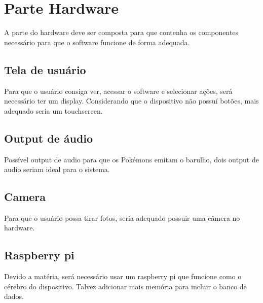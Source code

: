\documentclass[../main.tex]{subfiles}
\begin{document}
\section{Parte Hardware}

A parte do hardware deve ser composta para que contenha os componentes necessário para que o software funcione de forma adequada. \newline

\subsection{Tela de usuário}
Para que o usuário consiga ver, acessar o software e selecionar ações, será necessário ter um display. Considerando que o dispositivo não possuí botões, mais adequado seria um touchscreen. \newline

\subsection{Output de áudio}
Possível output de audio para que os Pokémons emitam o barulho, dois output de audio seriam ideal para o sistema. \newline

\subsection{Camera}
Para que o usuário possa tirar fotos, seria adequado possuir uma câmera no hardware. \newline

\subsection{Raspberry pi}
Devido a matéria, será necessário usar um raspberry pi que funcione como o cérebro do dispositivo. Talvez adicionar mais memória para incluir o banco de dados. \newline
\end{document}
